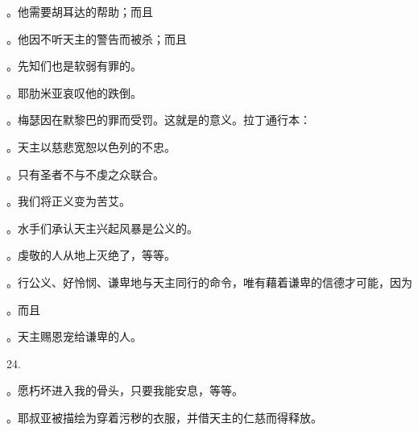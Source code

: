 。他需要胡耳达的帮助；而且\par

。他因不听天主的警告而被杀；而且\par

。先知们也是软弱有罪的。\par

。耶肋米亚哀叹他的跌倒。\par

。梅瑟因在默黎巴的罪而受罚。这就是的意义。拉丁通行本：\par

。天主以慈悲宽恕以色列的不忠。\par

。只有圣者不与不虔之众联合。\par

。我们将正义变为苦艾。\par

。水手们承认天主兴起风暴是公义的。\par

。虔敬的人从地上灭绝了，等等。\par

。行公义、好怜悯、谦卑地与天主同行的命令，唯有藉着谦卑的信德才可能，因为\par

。而且\par

。天主赐恩宠给谦卑的人。\par

24.\par

。愿朽坏进入我的骨头，只要我能安息，等等。\par

。耶叔亚被描绘为穿着污秽的衣服，并借天主的仁慈而得释放。\par

